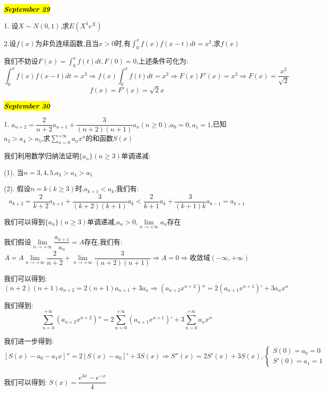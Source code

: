 \hl{\textbf{\textit{September 29}}}

1. 设$X\sim N(0,1)$,求$E(X^4e^{X})$
\begin{solution}
	
\end{solution}

2.设$f(x)$为非负连续函数,且当$x>0$时,有$\int_{0}^{x}f(x)f(x-t)dt=x^3$,求$f(x)$ 
\begin{solution}

	我们不妨设$F(x)=\int_{0}^{x}f(t)dt,F(0)=0$,上述条件可化为:  
	$$\int_{0}^{x}f(x)f(x-t)dt=x^3\Rightarrow f(x)\int_{0}^{x}f(t)dt=x^3\Rightarrow F(x)F'(x)=x^3\Rightarrow F(x)=\dfrac{x^2}{\sqrt{2}}$$
	$$f(x)=F'(x)=\sqrt{2}x$$
\end{solution}

\hl{\textbf{\textit{September 30}}}

1. $a_{n+2}=\dfrac{2}{n+2}a_{n+1}+\dfrac{3}{(n+2)(n+1)}a_{n}(n\geq 0)$,$a_{0}=0,a_{1}=1$,已知$a_{3}>a_{4}>a_{5}$,求$\sum\limits_{n=0}^{+\infty}a_{n}x^n$的和函数$S(x)$
\begin{solution}

	我们利用数学归纳法证明$\{a_{n}\}(n\geq 3)$单调递减:  
	
	(1). 当$n=3,4,5$,$a_{3}>a_{4}>a_{5}$
	
	(2). 假设$n=k(k\geq 3)$时,$a_{k+1}<a_{k}$,我们有:  
	$$a_{k+2}=\dfrac{2}{k+2}a_{k+1}+\dfrac{3}{(k+2)(k+1)}a_{k}<\dfrac{2}{k+1}a_{k}+\dfrac{3}{(k+1)k}a_{k-1}=a_{k+1}$$
	
	我们可以得到$\{a_{n}\}(n\geq 3)$单调递减,$a_{n}>0$,$\lim\limits_{n\rightarrow+\infty}a_{n}$存在
	
	我们假设$\lim\limits_{n\rightarrow+\infty}\dfrac{a_{n+1}}{a_{n}}=A$存在,我们有:  
	$$A=A\lim\limits_{n\rightarrow+\infty}\dfrac{2}{n+2}+\lim\limits_{n\rightarrow+\infty}\dfrac{3}{(n+2)(n+1)}\Rightarrow A=0\Rightarrow \text{收敛域}(-\infty,+\infty)$$
	
	我们可以得到:  
	$$(n+2)(n+1)a_{n+2}=2(n+1)a_{n+1}+3a_{n}\Rightarrow (a_{n+2}x^{n+2})''=2(a_{n+1}x^{n+1})'+3a_{n}x^n$$
	
	我们得到:  $$\sum\limits_{n=0}^{+\infty}(a_{n+2}x^{n+2})''=2\sum\limits_{n=0}^{+\infty}(a_{n+1}x^{n+1})'+3\sum\limits_{n=0}^{+\infty}a_{n}x^n$$
	
	我们进一步得到:  
	$$[S(x)-a_{0}-a_{1}x]''=2[S(x)-a_{0}]'+3S(x)\Rightarrow S''(x)=2S'(x)+3S(x),\left\lbrace
	\begin{array}{l}
		S(0)=a_{0}=0\\
		S'(0)=a_{1}=1
	\end{array}
	\right. $$
	
	我们可以得到:  $S(x)=\dfrac{e^{3x}-e^{-x}}{4}$
\end{solution}

